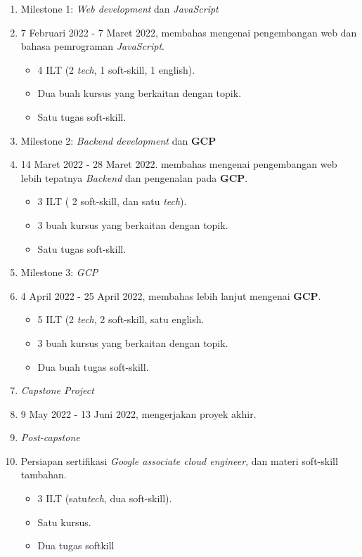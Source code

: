 \begin{enumerate}
    \item Milestone 1: \textit{Web development} dan \textit{JavaScript}
    \item[] 7 Februari 2022 - 7 Maret 2022, membahas mengenai pengembangan web dan bahasa pemrograman \textit{JavaScript}.
    \begin{itemize}
        \item 4 ILT (2 \textit{tech}, 1 soft-skill, 1 english).
        \item Dua buah kursus yang berkaitan dengan topik.
        \item Satu tugas soft-skill.
    \end{itemize}
    \item Milestone 2: \textit{Backend development} dan \textbf{GCP}
    \item[] 14 Maret 2022 - 28 Maret 2022. membahas mengenai pengembangan web lebih tepatnya \textit{Backend} dan pengenalan pada \textbf{GCP}.
    \begin{itemize}
        \item 3 ILT ( 2 soft-skill, dan satu \textit{tech}).
        \item 3 buah kursus yang berkaitan dengan topik.
        \item Satu tugas soft-skill.
    \end{itemize}
    \item Milestone 3: \textit{GCP}
    \item[] 4 April 2022 - 25 April 2022, membahas lebih lanjut mengenai \textbf{GCP}.
    \begin{itemize}
        \item 5 ILT (2 \textit{tech}, 2 soft-skill, satu english.
        \item 3 buah kursus yang berkaitan dengan topik.
        \item Dua buah tugas soft-skill.
    \end{itemize}
    \item \textit{Capstone Project}
    \item[] 9 May 2022 - 13 Juni 2022, mengerjakan proyek akhir.
    \item \textit{Post-capstone}
    \item[] Persiapan sertifikasi \textit{Google associate cloud engineer}, dan materi soft-skill tambahan.
    \begin{itemize}
        \item 3 ILT (satu\textit{tech}, dua soft-skill).
        \item Satu kursus.
        \item Dua tugas softkill
    \end{itemize}
\end{enumerate}